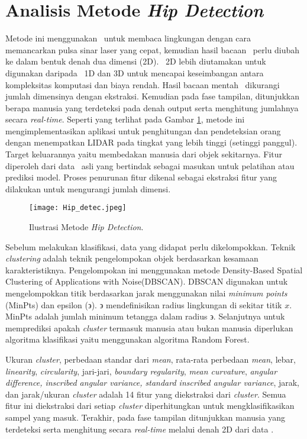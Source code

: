 \section{Analisis Metode \textit{Hip Detection}}
\label{sec:Metode_01}

    Metode ini menggunakan \lidar\ untuk membaca lingkungan dengan cara memancarkan pulsa sinar laser yang cepat, kemudian hasil bacaan \lidar\ perlu diubah ke dalam bentuk denah dua dimensi (2D). \lidar\ 2D lebih diutamakan untuk digunakan daripada \lidar\ 1D dan 3D untuk mencapai keseimbangan antara kompleksitas komputasi dan biaya rendah. Hasil bacaan mentah \lidar\ dikurangi jumlah dimensinya dengan ekstraksi. Kemudian pada fase tampilan, ditunjukkan berapa manusia yang terdeteksi pada denah output serta menghitung jumlahnya secara \textit{real-time}. Seperti yang terlihat pada Gambar \ref{fig:Ch02_Hip_Detec}, metode ini mengimplementasikan aplikasi untuk penghitungan dan pendeteksian orang dengan menempatkan LIDAR pada tingkat yang lebih tinggi (setinggi panggul)\cite{c3}. Target keluarannya yaitu membedakan manusia dari objek sekitarnya. 
    Fitur diperoleh dari data \lidar\ asli yang bertindak sebagai masukan untuk pelatihan atau prediksi model. Proses penurunan fitur dikenal sebagai ekstraksi fitur yang dilakukan untuk mengurangi jumlah dimensi. 
    
    \begin{figure}[H]
            \centering
            \texttt{[image: Hip\_detec.jpeg]}
            \caption{Ilustrasi Metode \textit{Hip Detection}.}
            \label{fig:Ch02_Hip_Detec}
        \end{figure}
 
    Sebelum melakukan klasifikasi, data yang didapat perlu dikelompokkan. Teknik \textit{clustering} adalah teknik pengelompokan objek berdasarkan kesamaan karakteristiknya. Pengelompokan ini menggunakan metode Density-Based Spatial Clustering of Applications with Noise(DBSCAN). DBSCAN digunakan untuk mengelompokkan titik berdasarkan jarak menggunakan nilai  \textit{minimum points} (MinPts) dan epsilon ($\backepsilon$). $\backepsilon $ mendefinisikan radius lingkungan di sekitar titik $x$. MinPts adalah jumlah minimum tetangga dalam radius $\backepsilon$. Selanjutnya untuk memprediksi apakah \textit{cluster} termasuk manusia atau bukan manusia diperlukan algoritma klasifikasi yaitu menggunakan algoritma Random Forest. 
    
    Ukuran \textit{cluster}, perbedaan standar dari \textit{mean}, rata-rata perbedaan \textit{mean}, lebar, \textit{linearity}, \textit{circularity}, jari-jari, \textit{boundary regularity}, \textit{mean curvature},\textit{ angular difference, inscribed angular variance, standard inscribed angular variance}, jarak, dan jarak/ukuran \textit{cluster} adalah 14 fitur yang diekstraksi dari \textit{cluster}. Semua fitur ini diekstraksi dari setiap \textit{cluster} diperhitungkan untuk mengklasifikasikan sampel yang masuk.  Terakhir, pada fase tampilan ditunjukkan manusia yang terdeteksi serta menghitung secara \textit{real-time} melalui denah 2D dari data \lidar.


